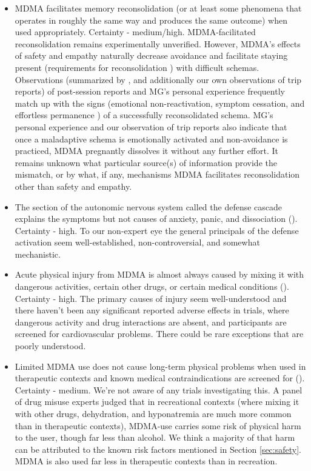 \documentclass[12pt,letterpaper]{book}
\begin{document}
\begin{itemize}
	\item MDMA facilitates memory reconsolidation (or at least some phenomena that operates in roughly the same way and produces the same outcome) when used appropriately. Certainty - medium/high. MDMA-facilitated reconsolidation remains experimentally unverified. However, MDMA's effects of safety and empathy naturally decrease avoidance and facilitate staying present (requirements for reconsolidation \cite{eckerUnlocking}) with difficult schemas. Observations (summarized by \textcite{fedduciaMDMAMemoryReconsolidation}, and additionally our own observations of trip reports) of post-session reports and MG's personal experience frequently match up with the signs (emotional non-reactivation, symptom cessation, and effortless permanence \cite{eckerUnlocking}) of a successfully reconsolidated schema. MG's personal experience and our observation of trip reports also indicate that once a maladaptive schema is emotionally activated and non-avoidance is practiced, MDMA pregnantly dissolves it without any further effort. It remains unknown what particular source(s) of information provide the mismatch, or by what, if any, mechanisms MDMA facilitates reconsolidation other than safety and empathy.
	\item The section of the autonomic nervous system called the defense cascade explains the symptoms but not causes of anxiety, panic, and dissociation (\textcite{kozlowskaDefenseCascade}). Certainty - high. To our non-expert eye the general principals of the defense activation seem well-established, non-controversial, and somewhat mechanistic.
	\item Acute physical injury from MDMA is almost always caused by mixing it with dangerous activities, certain other drugs, or certain medical conditions (\textcite{wolfgang2025}). Certainty - high. The primary causes of injury seem well-understood and there haven't been any significant reported adverse effects in trials, where dangerous activity and drug interactions are absent, and participants are screened for cardiovascular problems. There could be rare exceptions that are poorly understood.
	\item Limited MDMA use does not cause long-term physical problems when used in therapeutic contexts and known medical contraindications are screened for (\textcite{nuttDrugHarms}). Certainty - medium. We're not aware of any trials investigating this. A panel of drug misuse experts judged that in recreational contexts (where mixing it with other drugs, dehydration, and hyponatremia are much more common than in therapeutic contexts), MDMA-use carries some risk of physical harm to the user, though far less than alcohol. We think a majority of that harm can be attributed to the known risk factors mentioned in Section \ref{sec:safety}. MDMA is also used far less in therapeutic contexts than in recreation.

\end{itemize}
\end{document}
